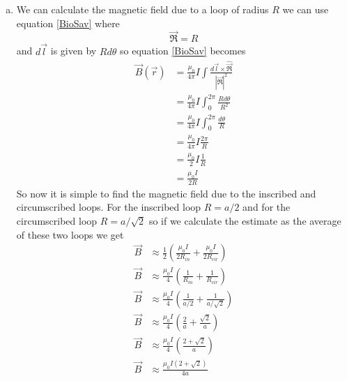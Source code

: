 \documentclass[11pt]{article}
\numberwithin{equation}{section}
\newcommand{\scrptR}{\vec{\mathfrak{R}}}
\begin{document}
\begin{enumerate}[(a)]
\item
We can calculate the magnetic field due to a loop of radius $R$ we can use equation \ref{BioSav} where
$$\scrptR = R$$
and $d\vec{l}$ is given by $Rd\theta$ so equation \ref{BioSav} becomes
\begin{align*}
\vec{B}(\vec{r}) &= \frac{\mu_0}{4\pi} I\int \frac{d\vec{l}\times\hat{\scrptR}}{|\scrptR|^2}\\
&= \frac{\mu_0}{4\pi} I\int_0^{2\pi} \frac{Rd\theta}{R^2}\\
&= \frac{\mu_0}{4\pi} I\int_0^{2\pi} \frac{d\theta}{R}\\
&= \frac{\mu_0}{4\pi} I\frac{2\pi}{R}\\
&= \frac{\mu_0}{2} I\frac{1}{R}\\
&= \frac{\mu_0I}{2R}
\end{align*}
So now it is simple to find the magnetic field due to the inscribed and circumscribed loops. For the inscribed loop $R=a/2$ and for the circumscribed loop $R=a/\sqrt{2}$ so if we calculate the estimate as the average of these two loops we get
\begin{align*}
\vec{B} &\approx \frac{1}{2}\left(\frac{\mu_0I}{2R_{in}} + \frac{\mu_0I}{2R_{cir}}\right)\\
\vec{B} &\approx \frac{\mu_0I}{4}\left(\frac{1}{R_{in}} + \frac{1}{R_{cir}}\right)\\
\vec{B} &\approx \frac{\mu_0I}{4}\left(\frac{1}{a/2} + \frac{1}{a/\sqrt{2}}\right)\\
\vec{B} &\approx \frac{\mu_0I}{4}\left(\frac{2}{a} + \frac{\sqrt{2}}{a}\right)\\
\vec{B} &\approx \frac{\mu_0I}{4}\left(\frac{2+\sqrt{2}}{a}\right)\\
\vec{B} &\approx \frac{\mu_0I(2+\sqrt{2})}{4a}
\end{align*}
\end{enumerate}
\end{document}
